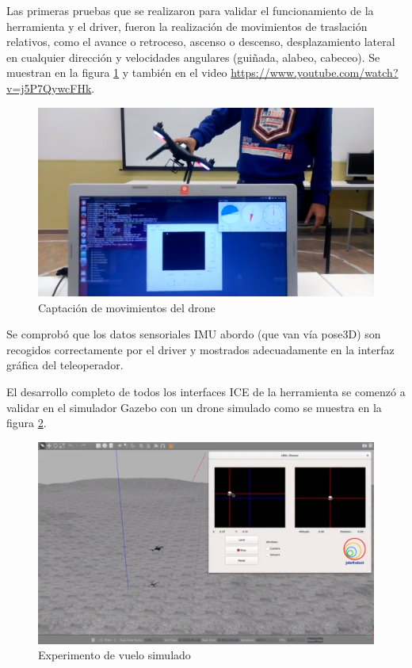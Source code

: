 Las primeras pruebas que se realizaron para validar el funcionamiento de la herramienta y el driver, fueron la realización de movimientos de traslación relativos, como el avance o retroceso, ascenso o descenso, desplazamiento lateral en cualquier dirección y velocidades angulares (guiñada, alabeo, cabeceo). Se muestran en la figura \ref{fig:experimentoConUAV} y también en el video \url{https://www.youtube.com/watch?v=j5P7QywcFHk}.
\begin{figure}[H]
  \centering
  \includegraphics[scale=0.25]{imagenes/EXP1.png}
  \caption{Captación de movimientos del drone}
  \label{fig:experimentoConUAV}
\end{figure}

Se comprobó que los datos sensoriales IMU abordo (que van vía pose3D) son recogidos correctamente por el driver y mostrados adecuadamente en la interfaz gráfica del teleoperador. 

El desarrollo completo de todos los interfaces ICE de la herramienta se comenzó a validar en el simulador Gazebo con un drone simulado como se muestra en la figura \ref{fig:experimentoConUAVsimulado}. 

\begin{figure}[H]
  \centering
  \includegraphics[scale=0.25]{imagenes/GAZEBO.png}
  \caption{Experimento de vuelo simulado}
  \label{fig:experimentoConUAVsimulado}
\end{figure}

